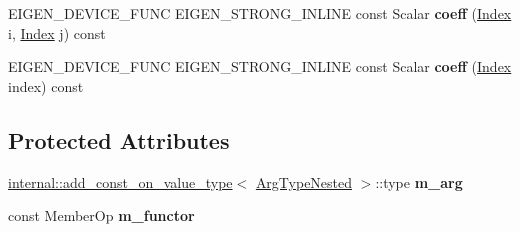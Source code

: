 \begin{DoxyCompactItemize}
\item 
\mbox{\label{struct_eigen_1_1internal_1_1evaluator_3_01_partial_redux_expr_3_01_arg_type_00_01_member_op_00_01_direction_01_4_01_4_a9436b5cbe9815a7a80d3222cd40fb8d7}} 
E\+I\+G\+E\+N\+\_\+\+D\+E\+V\+I\+C\+E\+\_\+\+F\+U\+NC E\+I\+G\+E\+N\+\_\+\+S\+T\+R\+O\+N\+G\+\_\+\+I\+N\+L\+I\+NE const Scalar {\bfseries coeff} (\hyperlink{namespace_eigen_a62e77e0933482dafde8fe197d9a2cfde}{Index} i, \hyperlink{namespace_eigen_a62e77e0933482dafde8fe197d9a2cfde}{Index} j) const
\item 
\mbox{\label{struct_eigen_1_1internal_1_1evaluator_3_01_partial_redux_expr_3_01_arg_type_00_01_member_op_00_01_direction_01_4_01_4_a5fe727d25f7814f608d734f57d8511a4}} 
E\+I\+G\+E\+N\+\_\+\+D\+E\+V\+I\+C\+E\+\_\+\+F\+U\+NC E\+I\+G\+E\+N\+\_\+\+S\+T\+R\+O\+N\+G\+\_\+\+I\+N\+L\+I\+NE const Scalar {\bfseries coeff} (\hyperlink{namespace_eigen_a62e77e0933482dafde8fe197d9a2cfde}{Index} index) const
\end{DoxyCompactItemize}
\subsection*{Protected Attributes}
\begin{DoxyCompactItemize}
\item 
\mbox{\label{struct_eigen_1_1internal_1_1evaluator_3_01_partial_redux_expr_3_01_arg_type_00_01_member_op_00_01_direction_01_4_01_4_af38302d68695e03a7c8cbfb332e355e3}} 
\hyperlink{struct_eigen_1_1internal_1_1add__const__on__value__type}{internal\+::add\+\_\+const\+\_\+on\+\_\+value\+\_\+type}$<$ \hyperlink{class_eigen_1_1internal_1_1_tensor_lazy_evaluator_writable}{Arg\+Type\+Nested} $>$\+::type {\bfseries m\+\_\+arg}
\item 
\mbox{\label{struct_eigen_1_1internal_1_1evaluator_3_01_partial_redux_expr_3_01_arg_type_00_01_member_op_00_01_direction_01_4_01_4_aa4d55dc703ff6c2bfb2074ce2fc3c4ac}} 
const Member\+Op {\bfseries m\+\_\+functor}
\end{DoxyCompactItemize}


